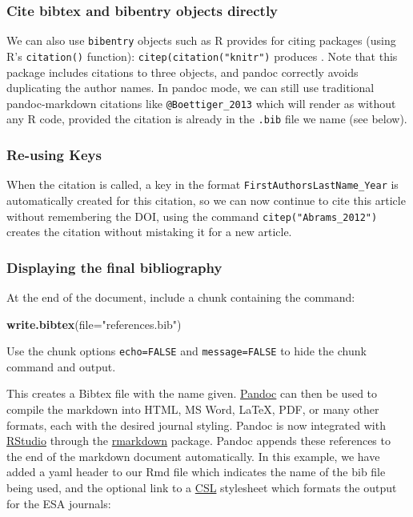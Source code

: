 \documentclass[]{article}
\newenvironment{Shaded}{\begin{snugshade}}{\end{snugshade}}
\newcommand{\KeywordTok}[1]{\textcolor[rgb]{0.13,0.29,0.53}{\textbf{{#1}}}}
\newcommand{\DataTypeTok}[1]{\textcolor[rgb]{0.13,0.29,0.53}{{#1}}}
\newcommand{\StringTok}[1]{\textcolor[rgb]{0.31,0.60,0.02}{{#1}}}
\newcommand{\NormalTok}[1]{{#1}}
\begin{document}
\subsubsection{Cite bibtex and bibentry objects
directly}\label{cite-bibtex-and-bibentry-objects-directly}

We can also use \texttt{bibentry} objects such as R provides for citing
packages (using R's \texttt{citation()} function):
\texttt{citep(citation("knitr")} produces
\citep{Xie_2015, Xie_2015a, Xie_2014}. Note that this package includes
citations to three objects, and pandoc correctly avoids duplicating the
author names. In pandoc mode, we can still use traditional
pandoc-markdown citations like \texttt{@Boettiger\_2013} which will
render as \citet{Boettiger_2013} without any R code, provided the
citation is already in the \texttt{.bib} file we name (see below).

\subsubsection{Re-using Keys}\label{re-using-keys}

When the citation is called, a key in the format
\texttt{FirstAuthorsLastName\_Year} is automatically created for this
citation, so we can now continue to cite this article without
remembering the DOI, using the command \texttt{citep("Abrams\_2012")}
creates the citation \citep{Abrams_2012} without mistaking it for a new
article.

\subsubsection{Displaying the final
bibliography}\label{displaying-the-final-bibliography}

At the end of the document, include a chunk containing the command:

\begin{Shaded}
\begin{Highlighting}[]
\KeywordTok{write.bibtex}\NormalTok{(}\DataTypeTok{file=}\StringTok{"references.bib"}\NormalTok{)}
\end{Highlighting}
\end{Shaded}

Use the chunk options \texttt{echo=FALSE} and \texttt{message=FALSE} to
hide the chunk command and output.

This creates a Bibtex file with the name given.
\href{http://johnmacfarlane.net/pandoc}{Pandoc} can then be used to
compile the markdown into HTML, MS Word, LaTeX, PDF, or many other
formats, each with the desired journal styling. Pandoc is now integrated
with \href{http://rstudio.com}{RStudio} through the
\href{http://rmarkdown.rstudio.com}{rmarkdown} package. Pandoc appends
these references to the end of the markdown document automatically. In
this example, we have added a yaml header to our Rmd file which
indicates the name of the bib file being used, and the optional link to
a \href{https://github.com/citation-style-language/styles}{CSL}
stylesheet which formats the output for the ESA journals:
\end{document}
